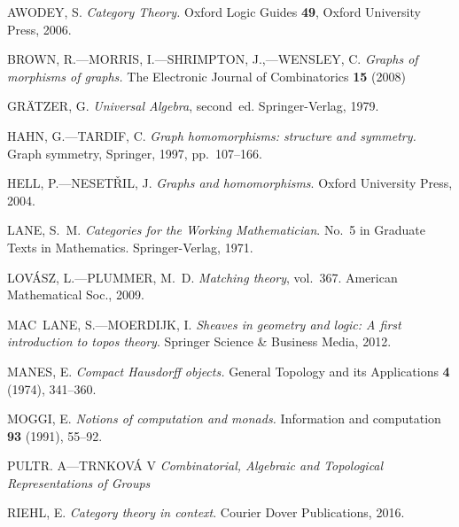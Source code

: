 \documentclass[reqno,A4paper]{amsart}
\theoremstyle{definition}
\numberwithin{equation}{section}
\begin{document}
\begin{thebibliography}{10}

\uppercase{Awodey, S.}
\newblock \textit{Category {T}heory.}
\newblock Oxford Logic Guides \textbf{49}, Oxford University Press, 2006.

\uppercase{Brown, R.---Morris, I.---Shrimpton, J.,---Wensley, C.}
\newblock \textit{Graphs of morphisms of graphs.}
\newblock The Electronic Journal of Combinatorics \textbf{15} (2008)

\uppercase{Gr{\" a}tzer, G.}
\newblock \textit{Universal Algebra}, second~ed.
\newblock Springer-Verlag, 1979.

\uppercase{Hahn, G.---Tardif, C.}
\newblock \textit{Graph homomorphisms: structure and symmetry.}
\newblock Graph symmetry, Springer, 1997, pp.~107--166.

\uppercase{Hell, P.---Neset\v ril, J.}
\newblock \textit{Graphs and homomorphisms}.
\newblock Oxford University Press, 2004.

\uppercase{Lane, S.~M.}
\newblock \textit{Categories for the Working Mathematician}.
\newblock No.~5 in Graduate Texts in Mathematics. Springer-Verlag, 1971.

\uppercase{Lov{\'a}sz, L.---Plummer, M.~D.}
\newblock \textit{Matching theory}, vol.~367.
\newblock American Mathematical Soc., 2009.

\uppercase{Mac~Lane, S.---Moerdijk, I.}
\newblock \textit{Sheaves in geometry and logic: A first introduction to topos
  theory}.
\newblock Springer Science \& Business Media, 2012.

\uppercase{Manes, E.}
\newblock \textit{Compact {H}ausdorff objects.}
\newblock General Topology and its Applications \textbf{4} (1974), 341--360.

\uppercase{Moggi, E.}
\newblock \textit{Notions of computation and monads.}
\newblock Information and computation \textbf{93} (1991), 55--92.

\uppercase{Pultr. A---Trnkov\'a V}
\newblock \textit{Combinatorial, Algebraic and Topological Representations of Groups}

\uppercase{Riehl, E.}
\newblock \textit{Category theory in context}.
\newblock Courier Dover Publications, 2016.

\end{thebibliography}
\end{document}
